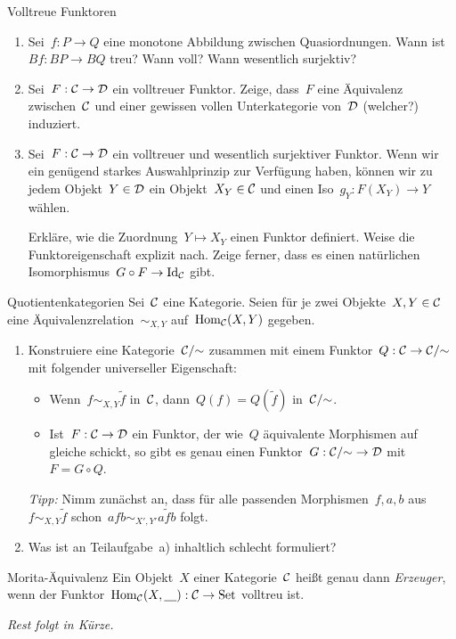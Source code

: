 \documentclass{uebblatt}
\begin{document}
\begin{aufgabe}{Volltreue Funktoren}
\begin{enumerate}
\item Sei~$f : P \to Q$ eine monotone Abbildung zwischen Quasiordnungen. Wann
ist~$Bf : BP \to BQ$ treu? Wann voll? Wann wesentlich surjektiv?
\item Sei~$F : \mathcal{C} \to \mathcal{D}$ ein volltreuer Funktor. Zeige, dass~$F$ eine Äquivalenz
zwischen~$\mathcal{C}$ und einer gewissen vollen Unterkategorie von~$\mathcal{D}$ (welcher?)
induziert.
\item Sei~$F : \mathcal{C} \to \mathcal{D}$ ein volltreuer und wesentlich surjektiver Funktor.
Wenn wir ein genügend starkes Auswahlprinzip zur Verfügung haben, können wir zu
jedem Objekt~$Y \in \mathcal{D}$ ein Objekt~$X_Y \in \mathcal{C}$ und einen
Iso~$g_Y : F(X_Y) \to Y$ wählen.

Erkläre, wie die Zuordnung~$Y \mapsto X_Y$ einen Funktor definiert. Weise die
Funk\-tor\-ei\-gen\-schaft explizit nach. Zeige ferner, dass es einen natürlichen
Isomorphismus~$G \circ F \to \mathrm{Id}_{\mathcal{C}}$ gibt.
\end{enumerate}
\end{aufgabe}

\begin{aufgabe}{Quotientenkategorien}
Sei~$\mathcal{C}$ eine Kategorie. Seien für je zwei Objekte~$X,Y \in \mathcal{C}$ eine
Äquivalenzrelation~$\sim_{X,Y}$ auf~$\mathrm{Hom}_{\mathcal{C}}(X,Y)$ gegeben.
\begin{enumerate}
\item Konstruiere eine Kategorie~$\mathcal{C}/{\sim}$ zusammen mit einem Funktor~$Q : \mathcal{C}
\to \mathcal{C}/{\sim}$ mit folgender universeller Eigenschaft:
\begin{itemize}
\item Wenn~$f \sim_{X,Y} \tilde f$ in~$\mathcal{C}$, dann~$Q(f) = Q(\tilde f)$ in~$\mathcal{C}/{\sim}$.
\item Ist~$F : \mathcal{C} \to \mathcal{D}$ ein Funktor, der wie~$Q$ äquivalente Morphismen auf gleiche
schickt, so gibt es genau einen Funktor~$G : \mathcal{C}/{\sim} \to \mathcal{D}$ mit~$F = G \circ
Q$.
\end{itemize}

\emph{Tipp:} Nimm zunächst an, dass für alle passenden Morphismen~$f,a,b$
aus~$f \sim_{X,Y} \tilde f$ schon~$afb \sim_{X',Y'} a\tilde fb$ folgt.

\item Was ist an Teilaufgabe~a) inhaltlich schlecht formuliert?
\end{enumerate}
\end{aufgabe}

\begin{aufgabe}{Morita-Äquivalenz}
Ein Objekt~$X$ einer Kategorie~$\mathcal{C}$ heißt genau dann \emph{Erzeuger}, wenn der
Funktor~$\mathrm{Hom}_{\mathcal{C}}(X, \underline{\quad}) : \mathcal{C} \to \mathrm{Set}$ volltreu ist.

\emph{Rest folgt in Kürze.}
\end{aufgabe}
\end{document}
